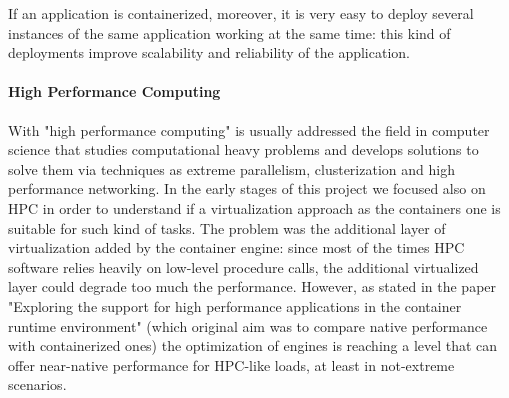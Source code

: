   If an application is containerized, moreover, it is very easy to deploy several instances of the same application working at the same time: this kind of deployments improve scalability and reliability of the application.\\

\paragraph{High Performance Computing}
  With "high performance computing" is usually addressed the field in computer science that studies computational heavy problems and develops solutions to solve them via techniques as extreme parallelism, clusterization and high performance networking. In the early stages of this project we focused also on HPC in order to understand if a virtualization approach as the containers one is suitable for such kind of tasks. The problem was the additional layer of virtualization added by the container engine: since most of the times HPC software relies heavily on low-level procedure calls, the additional virtualized layer could degrade too much the performance. However, as stated in the paper "Exploring the support for high performance applications in the container runtime environment"\cite{containershpc2} (which original aim was to compare native performance with containerized ones) the optimization of engines is reaching a level that can offer near-native performance for HPC-like loads, at least in not-extreme scenarios.

